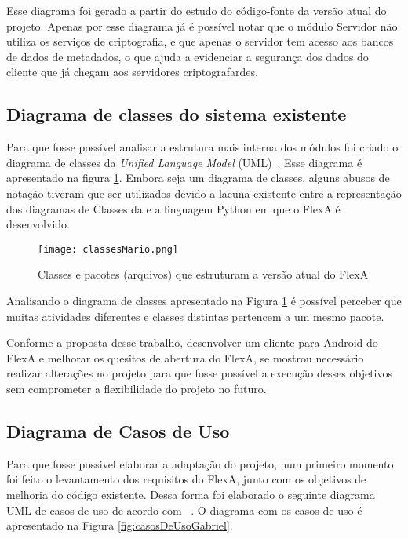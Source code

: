         Esse diagrama foi gerado a partir do estudo do código-fonte da versão atual do projeto. Apenas por esse diagrama já é possível notar que o módulo Servidor não utiliza os serviços de criptografia, e que apenas o servidor tem acesso aos bancos de dados de metadados, o que ajuda a evidenciar a segurança dos dados do cliente que já chegam aos servidores criptografardes.
    
    \subsection{Diagrama de classes do sistema existente} 
    
        Para que fosse possível analisar a estrutura mais interna dos módulos foi criado o diagrama de classes da \textit{Unified Language Model} (UML)~\cite{umlClasses}. Esse diagrama é apresentado na figura \ref{fig:classesMario}. Embora seja um diagrama de classes, alguns abusos de notação tiveram que ser utilizados devido a lacuna existente entre a representação dos diagramas de Classes da e a linguagem Python em que o FlexA é desenvolvido.
        
        \begin{figure}[!ht]
        \centering
        \texttt{[image: classesMario.png]}
        \caption{Classes e pacotes (arquivos) que estruturam a versão atual do FlexA}
        \label{fig:classesMario}
        \end{figure}
             

    
        Analisando o diagrama de classes apresentado na Figura \ref{fig:classesMario} é possível perceber que muitas atividades diferentes e classes distintas pertencem a um mesmo pacote. 
        
        
        Conforme a proposta desse trabalho, desenvolver um cliente para Android do FlexA e melhorar os quesitos de abertura do FlexA, se mostrou necessário realizar alterações no projeto para que fosse possível a execução desses objetivos sem comprometer a flexibilidade do projeto no futuro.
        
        \subsection{Diagrama de Casos de Uso}
        
        Para que fosse possivel elaborar a adaptação do projeto, num primeiro momento foi feito o levantamento dos requisitos do FlexA, junto com os objetivos de melhoria do código existente. Dessa forma foi elaborado o seguinte diagrama UML de casos de uso de acordo com ~\cite{umlCasosDeUso}. O diagrama com os casos de uso é apresentado na Figura \ref{fig:casosDeUsoGabriel}.
        
